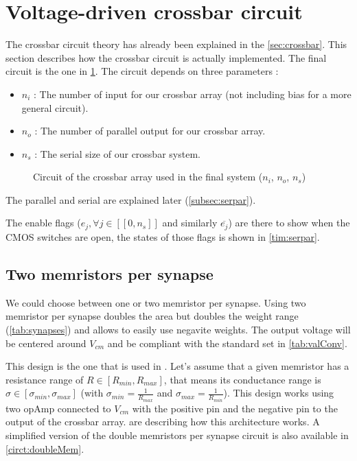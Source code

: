 \section{Voltage-driven crossbar circuit}
\label{sec:xbarCircuit}

The crossbar circuit theory has already been explained in the \cref{sec:crossbar}. This section describes how the crossbar circuit is actually implemented. The final circuit is the one in \cref{circt:xbar}. The circuit depends on three parameters :

\begin{itemize}
  \item $n_i$ : The number of input for our crossbar array (not including bias for a more general circuit).
  \item $n_o$ : The number of parallel output for our crossbar array.
  \item $n_s$ : The serial size of our crossbar system.
\end{itemize}

\begin{figure}[H]
  \centering
  
  \caption{Circuit of the crossbar array used in the final system ($n_i$, $n_o$, $n_s$)}
  \label{circt:xbar}
\end{figure}

The parallel and serial are explained later (\cref{subsec:serpar}).

The enable flags ($e_j,\forall j\in[\![ 0,n_s]\!]$ and similarly $\overline{e_j}$) are there to show when the \ac{CMOS} switches are open, the states of those flags is shown in \cref{tim:serpar}.

\subsection{Two memristors per synapse}
\label{subsec:doubleMem}

We could choose between one or two memristor per synapse. Using two memristor per synapse doubles the area but doubles the weight range (\cref{tab:synapses}) and allows to easily use negavite weights. The output voltage will be centered around $V_{cm}$ and be compliant with the standard set in \cref{tab:valConv}.

This design is the one that is used in \cite{doubleMem}. Let's assume that a given memristor has a resistance range of $R\in[R_{min},R_{max}]$, that means its conductance range is $\sigma \in [\sigma_{min},\sigma_{max}]$ (with $\sigma_{min}= \frac{1}{R_{max}}$ and $\sigma_{max}= \frac{1}{R_{min}}$). This design works using two \ac{opAmp} connected to $V_{cm}$ with the positive pin and the negative pin to the output of the crossbar array.  are describing how this architecture works. A simplified version of the double memristors per synapse circuit is also available in \cref{circt:doubleMem}.

